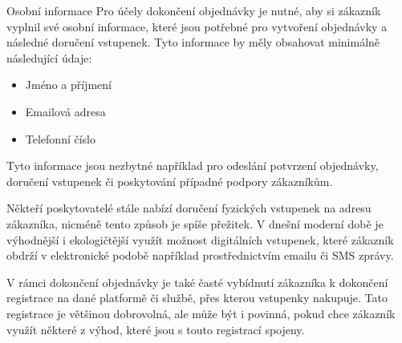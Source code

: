 \begin{subsection}{Osobní informace}
    \label{subsec:identifikace-dokonceni-objednavky-osobni-informace}
    Pro účely dokončení objednávky je nutné, aby si zákazník vyplnil své osobní informace, které jsou potřebné pro vytvoření objednávky a následné doručení vstupenek.
    Tyto informace by měly obsahovat minimálně následující údaje:

    \begin{itemize}
        \item Jméno a příjmení
        \item Emailová adresa
        \item Telefonní číslo
    \end{itemize}

    Tyto informace jsou nezbytné například pro odeslání potvrzení objednávky, doručení vstupenek či poskytování případné podpory zákazníkům.

    Někteří poskytovatelé stále nabízí doručení fyzických vstupenek na adresu zákazníka, nicméně tento způsob je spíše přežitek.
    V dnešní moderní době je výhodnější i ekologičtější využít možnost digitálních vstupenek, které zákazník obdrží v elektronické podobě například prostřednictvím emailu či SMS zprávy.

    V rámci dokončení objednávky je také časté vybídnutí zákazníka k dokončení registrace na dané platformě či službě, přes kterou vstupenky nakupuje.
    Tato registrace je většinou dobrovolná, ale může být i povinná, pokud chce zákazník využít některé z výhod, které jsou s touto registrací spojeny.
\end{subsection}
\pagebreak
